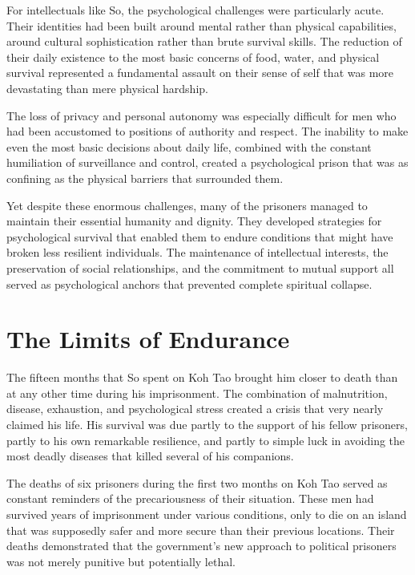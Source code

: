 \documentclass[
  Letterpaper,
]{scrbook}
\begin{document}
For intellectuals like So, the psychological challenges were
particularly acute. Their identities had been built around mental rather
than physical capabilities, around cultural sophistication rather than
brute survival skills. The reduction of their daily existence to the
most basic concerns of food, water, and physical survival represented a
fundamental assault on their sense of self that was more devastating
than mere physical hardship.

The loss of privacy and personal autonomy was especially difficult for
men who had been accustomed to positions of authority and respect. The
inability to make even the most basic decisions about daily life,
combined with the constant humiliation of surveillance and control,
created a psychological prison that was as confining as the physical
barriers that surrounded them.

Yet despite these enormous challenges, many of the prisoners managed to
maintain their essential humanity and dignity. They developed strategies
for psychological survival that enabled them to endure conditions that
might have broken less resilient individuals. The maintenance of
intellectual interests, the preservation of social relationships, and
the commitment to mutual support all served as psychological anchors
that prevented complete spiritual collapse.

\section{The Limits of Endurance}\label{the-limits-of-endurance}

The fifteen months that So spent on Koh Tao brought him closer to death
than at any other time during his imprisonment. The combination of
malnutrition, disease, exhaustion, and psychological stress created a
crisis that very nearly claimed his life. His survival was due partly to
the support of his fellow prisoners, partly to his own remarkable
resilience, and partly to simple luck in avoiding the most deadly
diseases that killed several of his companions.

The deaths of six prisoners during the first two months on Koh Tao
served as constant reminders of the precariousness of their situation.
These men had survived years of imprisonment under various conditions,
only to die on an island that was supposedly safer and more secure than
their previous locations. Their deaths demonstrated that the
government's new approach to political prisoners was not merely punitive
but potentially lethal.
\end{document}
